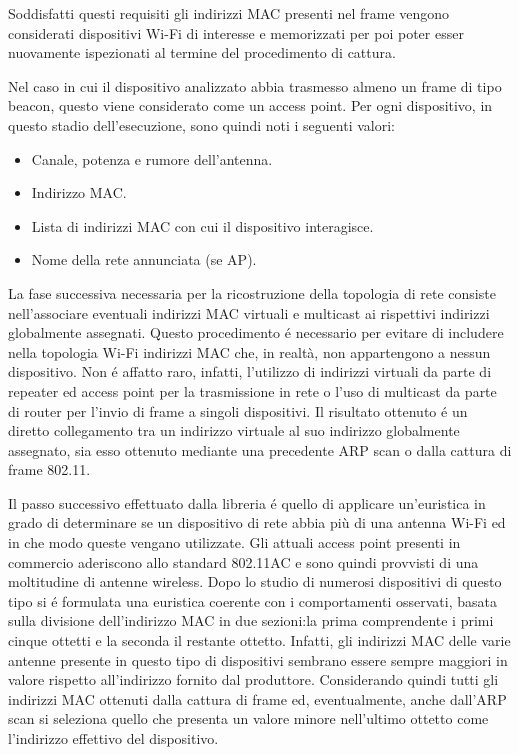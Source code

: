 Soddisfatti questi requisiti gli indirizzi MAC presenti nel frame vengono considerati dispositivi Wi-Fi di interesse e memorizzati per poi poter esser nuovamente ispezionati al termine del procedimento di cattura.

Nel caso in cui il dispositivo analizzato abbia trasmesso almeno un frame di tipo beacon, questo viene considerato come un access point.
\newpage
Per ogni dispositivo, in questo stadio dell'esecuzione, sono quindi noti i seguenti valori:
\begin{itemize}
	\item Canale, potenza e rumore dell'antenna.
	\item Indirizzo MAC.
	\item Lista di indirizzi MAC con cui il dispositivo interagisce.
	\item Nome della rete annunciata (se AP).
\end{itemize}

La fase successiva necessaria per la ricostruzione della topologia di rete consiste nell'associare eventuali indirizzi MAC virtuali e multicast ai rispettivi indirizzi globalmente assegnati.
Questo procedimento \'e necessario per evitare di includere nella topologia Wi-Fi indirizzi MAC che, in realt\`a, non appartengono a nessun dispositivo.
Non \'e affatto raro, infatti, l'utilizzo di indirizzi virtuali da parte di repeater ed access point per la trasmissione in rete o l'uso di multicast da parte di router per l'invio di frame a singoli dispositivi.
Il risultato ottenuto \'e un diretto collegamento tra un indirizzo virtuale al suo indirizzo globalmente assegnato, sia esso ottenuto mediante una precedente ARP scan o dalla cattura di frame 802.11.

Il passo successivo effettuato dalla libreria \'e quello di applicare un'euristica in grado di determinare se un dispositivo di rete abbia pi\`u di una antenna Wi-Fi ed in che modo queste vengano utilizzate.
Gli attuali access point presenti in commercio aderiscono allo standard 802.11AC e sono quindi provvisti di una moltitudine di antenne wireless.
Dopo lo studio di numerosi dispositivi di questo tipo si \'e formulata una euristica coerente con i comportamenti osservati, basata sulla divisione dell'indirizzo MAC in due sezioni:la prima comprendente i primi cinque ottetti e la seconda il restante ottetto.
Infatti, gli indirizzi MAC delle varie antenne presente in questo tipo di dispositivi sembrano essere sempre maggiori in valore rispetto all'indirizzo fornito dal produttore.
Considerando quindi tutti gli indirizzi MAC ottenuti dalla cattura di frame ed, eventualmente, anche dall'ARP scan si seleziona quello che presenta un valore minore nell'ultimo ottetto come l'indirizzo effettivo del dispositivo.

